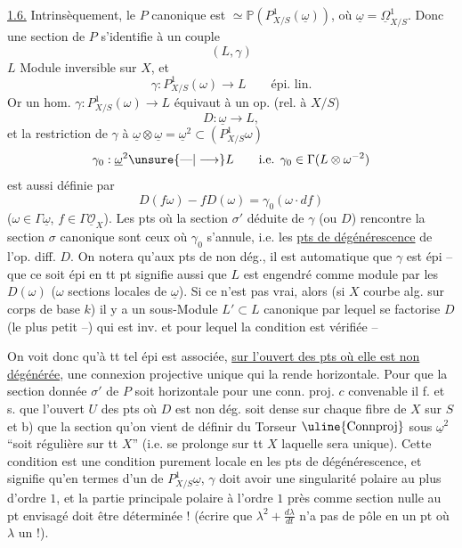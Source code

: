 \uline{1.6.} Intrinsèquement, le $P$ canonique est $\simeq\mathbb{P}(P^1_{X/S}(\underline{\omega}))$, où $\underline{\omega}=\underline{\Omega}^1_{X/S}$. Donc une section de $P$ s'identifie à un couple
\[
(L,\gamma)
\]
$L$ Module inversible sur $X$, et
\[
\gamma:P^1_{X/S}(\omega)\longrightarrow L\qquad\text{épi. lin.}
\]
Or un hom.  $\gamma:P^1_{X/S}(\omega)\longrightarrow L$ équivaut à
un op.  (rel. à $X/S$)
\[
D:\underline{\omega}\longrightarrow L,
\]
et la restriction de $\gamma$ à $\underline{\omega}\otimes\underline{\omega}=\underline{\omega}^2\subset(P^1_{X/S}\omega)$
\[
\gamma_0:\underline{\omega}^2\unsure{\text{---}|\longrightarrow}L\qquad\text{i.e. }\gamma_0\in\Gamma(L\otimes\omega^{-2})
\]
est aussi définie par
\[
D(f\omega)-fD(\omega)=\gamma_0(\omega\cdot df)
\]
($\omega\in\Gamma\underline{\omega}$, $f\in\Gamma\underline{\mathcal{O}}_X$). Les pts où la section $\sigma'$ déduite de $\gamma$ (ou $D$) rencontre la section $\sigma$ canonique sont ceux où $\gamma_0$ s'annule, i.e. les \uline{pts de dégénérescence} de l'op. diff. $D$. On notera qu'aux pts de non dég., il est automatique que $\gamma$ est épi -- que ce soit épi en tt pt signifie aussi que $L$ est engendré comme module par les $D(\omega)$ ($\omega$ sections locales de $\underline{\omega}$). Si ce n'est pas vrai, alors (si $X$ courbe alg. sur corps de base $k$) il y a un sous-Module $L'\subset L$ canonique par lequel se factorise $D$ (le plus petit --) qui est inv. et pour lequel la condition est vérifiée --

On voit donc qu'à tt tel épi est associée, \uline{sur l'ouvert des pts où elle est non dégénérée}, une connexion projective  unique qui la rende horizontale. 
Pour que la section donnée $\sigma'$ de $P$ soit horizontale pour une conn. proj. $c$ convenable il f. et s.  que l'ouvert $U$ des pts où $D$ est non dég. soit dense sur chaque fibre de $X$ sur $S$ et b) que la section qu'on vient de définir  du Torseur $\uline{\operatorname{Connproj}}$ sous $\underline{\omega}^2$  ``soit régulière sur tt $X$'' (i.e. se prolonge  sur tt $X$ laquelle sera unique). Cette condition est une condition purement locale en les pts de   dégénérescence, et signifie qu'en termes d'un  de $P^1_{X/S}\underline{\omega}$, $\gamma$  doit avoir une singularité polaire au plus d'ordre $1$, et la partie   principale polaire à l'ordre $1$ près comme section nulle au pt envisagé doit être déterminée ! (écrire que $\lambda^2+\frac{d\lambda}{dt}$ n'a pas de pôle en un pt où $\lambda$  un !).

